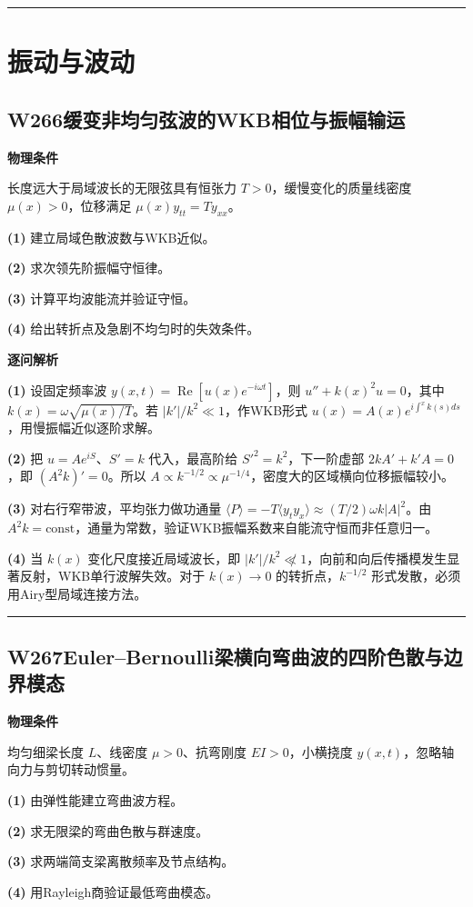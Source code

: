 \documentclass[UTF8,a4paper,11pt,oneside,openany]{ctexbook}
\begin{document}
\par\bigskip\hrule\bigskip
\chapter{振动与波动}
\section*{W266\quad 缓变非均匀弦波的WKB相位与振幅输运}
\textbf{物理条件}\par 长度远大于局域波长的无限弦具有恒张力 \(T>0\)，缓慢变化的质量线密度 \(\mu(x)>0\)，位移满足 \(\mu(x)y_{tt}=Ty_{xx}\)。
\par\noindent\textbf{(1)} 建立局域色散波数与WKB近似。
\par\noindent\textbf{(2)} 求次领先阶振幅守恒律。
\par\noindent\textbf{(3)} 计算平均波能流并验证守恒。
\par\noindent\textbf{(4)} 给出转折点及急剧不均匀时的失效条件。

\par\medskip\noindent\textbf{逐问解析}
\par\noindent\textbf{(1)} 设固定频率波 \(y(x,t)=\operatorname{Re}[u(x)e^{-i\omega t}]\)，则 \(u''+k(x)^2u=0\)，其中 \(k(x)=\omega\sqrt{\mu(x)/T}\)。若 \(|k'|/k^2\ll1\)，作WKB形式 \(u(x)=A(x)e^{i\int^xk(s)ds}\)，用慢振幅近似逐阶求解。
\par\noindent\textbf{(2)} 把 \(u=Ae^{iS}\)、\(S'=k\) 代入，最高阶给 \(S'^2=k^2\)，下一阶虚部 \(2kA'+k'A=0\)，即 \((A^2k)'=0\)。所以 \(A\propto k^{-1/2}\propto\mu^{-1/4}\)，密度大的区域横向位移振幅较小。
\par\noindent\textbf{(3)} 对右行窄带波，平均张力做功通量 \(\langle P\rangle=-T\langle y_ty_x\rangle\approx(T/2)\omega k|A|^2\)。由 \(A^2k=\mathrm{const}\)，通量为常数，验证WKB振幅系数来自能流守恒而非任意归一。
\par\noindent\textbf{(4)} 当 \(k(x)\) 变化尺度接近局域波长，即 \(|k'|/k^2\not\ll1\)，向前和向后传播模发生显著反射，WKB单行波解失效。对于 \(k(x)\to0\) 的转折点，\(k^{-1/2}\) 形式发散，必须用Airy型局域连接方法。

\par\bigskip\hrule\bigskip
\section*{W267\quad Euler–Bernoulli梁横向弯曲波的四阶色散与边界模态}
\textbf{物理条件}\par 均匀细梁长度 \(L\)、线密度 \(\mu>0\)、抗弯刚度 \(EI>0\)，小横挠度 \(y(x,t)\)，忽略轴向力与剪切转动惯量。
\par\noindent\textbf{(1)} 由弹性能建立弯曲波方程。
\par\noindent\textbf{(2)} 求无限梁的弯曲色散与群速度。
\par\noindent\textbf{(3)} 求两端简支梁离散频率及节点结构。
\par\noindent\textbf{(4)} 用Rayleigh商验证最低弯曲模态。
\end{document}
